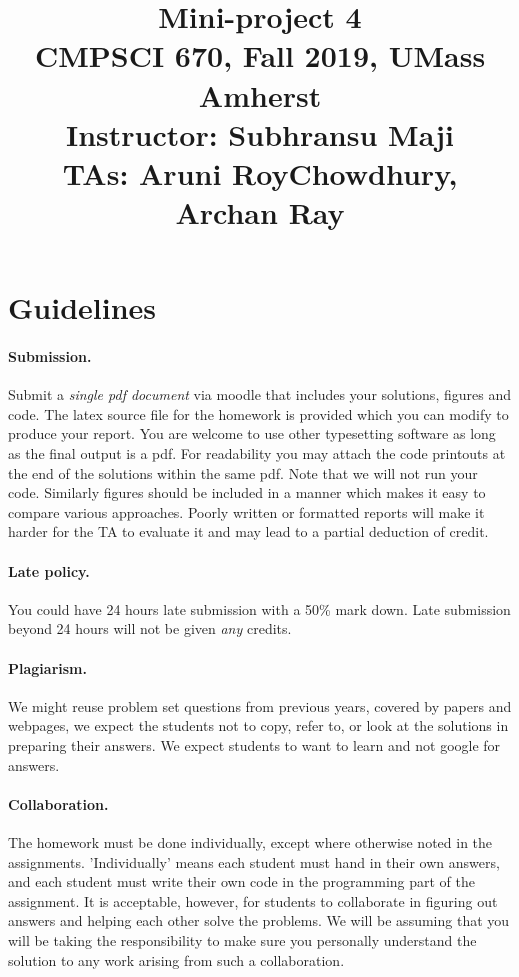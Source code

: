 \documentclass[10pt,letterpaper]{article}
\title{
  \textbf{Mini-project 4} \\
  \Large{CMPSCI 670, Fall 2019, UMass Amherst} \\
  \Large{Instructor: Subhransu Maji} \\
  \Large{TAs: Aruni RoyChowdhury, Archan Ray}
}
\date{}
\begin{document}
\maketitle

\renewcommand\thesubsection{\thesection.\alph{subsection}}


\section*{Guidelines}

\paragraph{Submission.} Submit a \emph{single pdf document} via moodle that includes your solutions, figures and code. The latex source file for the homework is provided which you can modify to produce your report. You are welcome to use other typesetting software as long as the final output is a pdf. For readability you may attach the code printouts at the end of the solutions within the same pdf. Note that we will not run your code. Similarly figures should be included in a manner which makes it easy to compare various approaches. Poorly written or formatted reports will make it harder for the TA to evaluate it and may lead to a partial deduction of credit. 

\paragraph{Late policy.} You could have 24 hours late submission with a 50\% mark down. Late submission beyond 24 hours will not be given \emph{any} credits.

\paragraph{Plagiarism.} We might reuse problem set questions from previous years, covered by papers and webpages, we expect the students not to copy, refer to, or look at the solutions in preparing their answers. We expect students to want to learn and not google for answers. 

\paragraph{Collaboration.} The homework must be done individually, except where otherwise noted in the assignments. 'Individually' means each student must hand in their own answers, and each student must write their own code in the programming part of the assignment. It is acceptable, however, for students to collaborate in figuring out answers and helping each other solve the problems. We will be assuming that you will be taking the responsibility to make sure you personally understand the solution to any work arising from such a collaboration.
\end{document}

